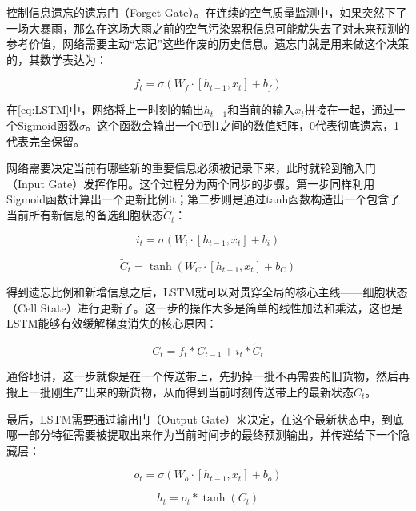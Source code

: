 控制信息遗忘的遗忘门（Forget Gate）。在连续的空气质量监测中，如果突然下了一场大暴雨，那么在这场大雨之前的空气污染累积信息可能就失去了对未来预测的参考价值，网络需要主动“忘记”这些作废的历史信息。遗忘门就是用来做这个决策的，其数学表达为：

\begin{equation}\label{eq:LSTM}
    f_t = \sigma(W_f \cdot [h_{t-1}, x_t] + b_f)
\end{equation}

在\cref{eq:LSTM}中，网络将上一时刻的输出$h_{t-1}$和当前的输入$x_t$拼接在一起，通过一个Sigmoid函数$\sigma$。这个函数会输出一个0到1之间的数值矩阵，0代表彻底遗忘，1代表完全保留。

网络需要决定当前有哪些新的重要信息必须被记录下来，此时就轮到输入门（Input Gate）发挥作用。这个过程分为两个同步的步骤。第一步同样利用Sigmoid函数计算出一个更新比例it；第二步则是通过tanh函数构造出一个包含了当前所有新信息的备选细胞状态$\tilde{C}_t$：

\begin{equation}\label{eq:LSTM_Input}
    i_t = \sigma(W_i \cdot [h_{t-1}, x_t] + b_i)
\end{equation}

\begin{equation}\label{eq:LSTM_Cell}
    \tilde{C}_t = \tanh(W_C \cdot [h_{t-1}, x_t] + b_C)
\end{equation}

得到遗忘比例和新增信息之后，LSTM就可以对贯穿全局的核心主线——细胞状态（Cell State）进行更新了。这一步的操作大多是简单的线性加法和乘法，这也是LSTM能够有效缓解梯度消失的核心原因：

\begin{equation}\label{eq:LSTM_Cell_Update}
    C_t = f_t * C_{t-1} + i_t * \tilde{C}_t
\end{equation}

通俗地讲，这一步就像是在一个传送带上，先扔掉一批不再需要的旧货物，然后再搬上一批刚生产出来的新货物，从而得到当前时刻传送带上的最新状态$C_t$。

最后，LSTM需要通过输出门（Output Gate）来决定，在这个最新状态中，到底哪一部分特征需要被提取出来作为当前时间步的最终预测输出，并传递给下一个隐藏层：

\begin{equation}\label{eq:LSTM_Output}
    o_t = \sigma(W_o \cdot [h_{t-1}, x_t] + b_o)
\end{equation}

\begin{equation}\label{eq:LSTM_Hidden}
    h_t = o_t * \tanh(C_t)
\end{equation}

